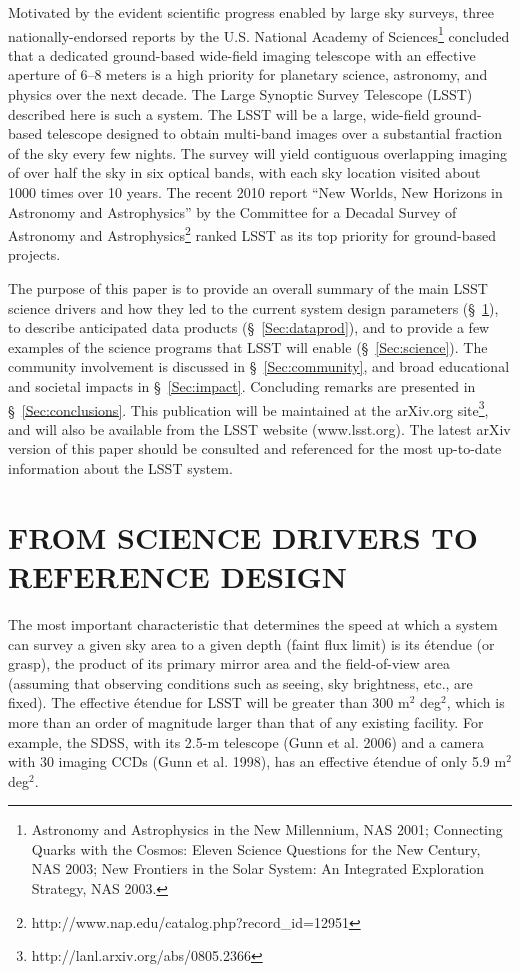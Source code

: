 \documentclass{emulateapj}
\begin{document}
Motivated by the evident scientific progress enabled by large sky surveys,
three nationally-endorsed reports by the U.S. National Academy of Sciences\footnote{
  Astronomy and Astrophysics in the New Millennium, NAS 2001; 
  Connecting Quarks with the Cosmos: Eleven Science Questions for the New Century, NAS 2003; 
  New Frontiers in the Solar System: An Integrated Exploration Strategy, NAS 2003.   
}
concluded that a dedicated ground-based wide-field imaging telescope with an effective aperture 
of 6--8 meters is a high priority for planetary science, astronomy, and physics 
over the next decade. The Large Synoptic Survey Telescope (LSST) described here is 
such a system. The LSST will be a large, wide-field ground-based telescope 
designed to obtain multi-band images over a substantial fraction of the sky
every few nights. The survey will yield contiguous overlapping imaging of over
half the sky in six optical bands, with each sky location visited about 1000 times over 
10 years. The recent 2010 report ``New Worlds, New Horizons in Astronomy and Astrophysics''
by the Committee for a Decadal Survey of Astronomy and 
Astrophysics\footnote{http://www.nap.edu/catalog.php?record\_id=12951}
ranked LSST as its top priority for ground-based projects. 

The purpose of this paper is to provide an overall summary of the main LSST
science drivers and how they led to the current system design parameters 
(\S~\ref{Sec:refdesign}), to describe anticipated data products (\S~\ref{Sec:dataprod}), 
and to provide a few examples of the science programs that LSST will enable 
(\S~\ref{Sec:science}). The community involvement is discussed in \S~\ref{Sec:community}, 
and broad educational and societal impacts in \S~\ref{Sec:impact}. Concluding 
remarks are presented in \S~\ref{Sec:conclusions}. This publication will be maintained 
at the arXiv.org site\footnote{http://lanl.arxiv.org/abs/0805.2366}, and will also
be available from the LSST website (www.lsst.org). The latest arXiv version of this paper 
should be consulted and referenced for the most up-to-date information about the 
LSST system.


\newpage
\section{FROM SCIENCE DRIVERS TO REFERENCE DESIGN}
\label{Sec:refdesign}

The most important characteristic that determines the speed at which a system can 
survey a given sky area to a given depth (faint flux limit) is its \'etendue
(or grasp), the product of its primary mirror area and the field-of-view area (assuming
that observing conditions such as seeing, sky brightness, etc., are fixed). 
The effective \'etendue for LSST will be greater than 300 m$^2$ deg$^2$, which
is more than an order of magnitude larger than that of any existing facility.  
For example, the SDSS, with its 2.5-m telescope (Gunn et al. 2006) and a
camera with 30 imaging CCDs (Gunn et al. 1998), has an effective \'etendue of 
only 5.9 m$^2$ deg$^2$.
\end{document}
